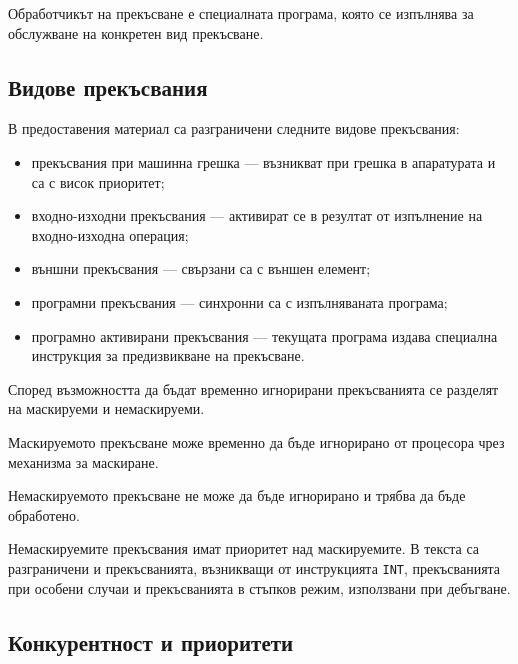 \begin{defn}
Обработчикът на прекъсване е специалната програма, която се изпълнява за обслужване на конкретен вид прекъсване.
\end{defn}

\subsection{Видове прекъсвания}\label{s:10.4.3}

В предоставения материал са разграничени следните видове прекъсвания:

\begin{itemize}
    \item прекъсвания при машинна грешка --- възникват при грешка в апаратурата и са с висок приоритет;
    \item входно-изходни прекъсвания --- активират се в резултат от изпълнение на входно-изходна операция;
    \item външни прекъсвания --- свързани са с външен елемент;
    \item програмни прекъсвания --- синхронни са с изпълняваната програма;
    \item програмно активирани прекъсвания --- текущата програма издава специална инструкция за предизвикване на прекъсване.
\end{itemize}

Според възможността да бъдат временно игнорирани прекъсванията се разделят на маскируеми и немаскируеми.

\begin{defn}
Маскируемото прекъсване може временно да бъде игнорирано от процесора чрез механизма за маскиране.
\end{defn}

\begin{defn}
Немаскируемото прекъсване не може да бъде игнорирано и трябва да бъде обработено.
\end{defn}

Немаскируемите прекъсвания имат приоритет над маскируемите. В текста са разграничени и прекъсванията, възникващи от инструкцията \verb|INT|, прекъсванията при особени случаи и прекъсванията в стъпков режим, използвани при дебъгване.

\subsection{Конкурентност и приоритети}\label{s:10.4.4}

